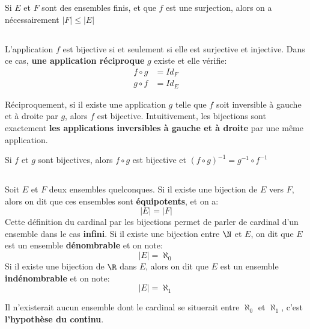 Si \(E\) et \(F\) sont des ensembles finis, et que \(f\) est une surjection, alors on a nécessairement \(|F| \leq |E|\)
\subsection*{}
L'application \(f\) est bijective si et seulement si elle est surjective et injective.\+  
Dans ce cas, \textbf{une application réciproque} \(g\) existe et elle vérifie:
    \begin{align*}
        f \circ g &= Id_F \\
        g \circ f &= Id_E
    \end{align*}


Réciproquement, si il existe une application \(g\) telle que \(f\) soit inversible à gauche et à droite par \(g\), alors \(f\) est bijective.\+
Intuitivement, les bijections sont exactement \textbf{les applications inversibles à gauche et à droite} par une même application.\<

Si \(f\) et \(g\) sont bijectives, alors \(f \circ g\) est bijective et \((f \circ g)^{-1} = g^{-1} \circ f^{-1}\)

\subsection*{}
Soit \(E\) et \(F\) deux ensembles quelconques.\+
Si il existe une bijection de \(E\) vers \(F\), alors on dit que ces ensembles sont \textbf{équipotents}, et on a:
\[
    |E| = |F|
\]
Cette définition du cardinal par les bijections permet de parler de cardinal d'un ensemble dans le cas \textbf{infini}.\+
Si il existe une bijection entre \(\N\) et \(E\), on dit que \(E\) est un ensemble \textbf{dénombrable} et on note:
\[
    |E| = \aleph_0
\]
Si il existe une bijection de \(\R\) dans \(E\), alors on dit que \(E\) est un ensemble \textbf{indénombrable} et on note:
\[
    |E| = \aleph_1
\]

Il n'existerait aucun ensemble dont le cardinal se situerait entre \(\aleph_0\) et \(\aleph_1\), c'est \textbf{l'hypothèse du continu}.
